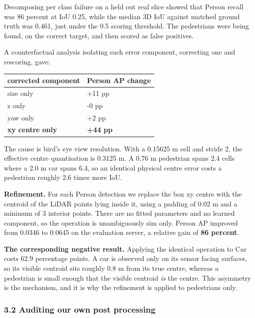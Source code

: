 \documentclass[
  10pt,
]{article}
\newcounter{none} %
\begin{document}
Decomposing per class failure on a held out real slice showed that
Person recall was 86 percent at IoU 0.25, while the median 3D IoU
against matched ground truth was 0.461, just under the 0.5 scoring
threshold. The pedestrians were being found, on the correct target, and
then scored as false positives.

A counterfactual analysis isolating each error component, correcting one
and rescoring, gave:

{\def\LTcaptype{none} %
\begin{longtable}[]{@{}ll@{}}
\toprule\noalign{}
corrected component & Person AP change \\
\midrule\noalign{}
\endhead
\bottomrule\noalign{}
\endlastfoot
size only & +11 pp \\
z only & -0 pp \\
yaw only & +2 pp \\
\textbf{xy centre only} & \textbf{+44 pp} \\
\end{longtable}
}

The cause is bird's eye view resolution. With a 0.15625 m cell and
stride 2, the effective centre quantisation is 0.3125 m. A 0.76 m
pedestrian spans 2.4 cells where a 2.0 m car spans 6.4, so an identical
physical centre error costs a pedestrian roughly 2.6 times more IoU.

\textbf{Refinement.} For each Person detection we replace the box xy
centre with the centroid of the LiDAR points lying inside it, using a
padding of 0.02 m and a minimum of 3 interior points. There are no
fitted parameters and no learned component, so the operation is
unambiguously sim only. Person AP improved from 0.0346 to 0.0645 on the
evaluation server, a relative gain of \textbf{86 percent}.

\textbf{The corresponding negative result.} Applying the identical
operation to Car costs 62.9 percentage points. A car is observed only on
its sensor facing surfaces, so its visible centroid sits roughly 0.8 m
from its true centre, whereas a pedestrian is small enough that the
visible centroid \emph{is} the centre. This asymmetry is the mechanism,
and it is why the refinement is applied to pedestrians only.

\subsubsection{3.2 Auditing our own post
processing}\label{auditing-our-own-post-processing}
\end{document}
